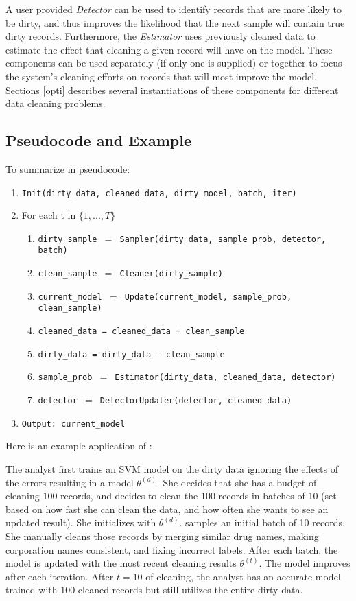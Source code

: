 A user provided {\it Detector} can be used to identify records that are more likely to be dirty, and  thus improves the likelihood that the next sample will contain true dirty records.
Furthermore, the {\it Estimator} uses previously cleaned data to estimate the effect that cleaning a given record will have on the model.
These components can be used separately (if only one is supplied) or together to focus the system's cleaning efforts on records that will most improve the model.
Sections \ref{opti} describes several instantiations of these components for different data cleaning problems.

\subsection{Pseudocode and Example}
\noindent To summarize in pseudocode:
\begin{enumerate}[leftmargin=1em]\scriptsize\sloppy
\item \texttt{Init(dirty\_data, cleaned\_data, dirty\_model, batch, iter)}
\item For each t in $\{1,...,T\}$
\begin{enumerate}
	\item \texttt{dirty\_sample $=$ Sampler(dirty\_data, sample\_prob, detector, batch)}
	\item \texttt{clean\_sample $=$ Cleaner(dirty\_sample)}
	\item \texttt{current\_model $=$ Update(current\_model, sample\_prob, clean\_sample)}
	\item \texttt{cleaned\_data = cleaned\_data + clean\_sample}
	\item \texttt{dirty\_data = dirty\_data - clean\_sample}
	\item \texttt{sample\_prob $=$ Estimator(dirty\_data, cleaned\_data, detector)}
	\item \texttt{detector $=$ DetectorUpdater(detector, cleaned\_data)}
\end{enumerate}
\item \texttt{Output: current\_model}
\end{enumerate}

Here is an example application of \sys:
\begin{example}\label{archex}
The analyst first trains an SVM model on the dirty data ignoring the effects of the errors resulting in a model $\theta^{(d)}$.
She decides that she has a budget of cleaning $100$ records, and decides to clean the 100 records in batches of 10 (set based on how fast she can clean the data, and how often she wants to see an updated result).
She initializes \sys with $\theta^{(d)}$.
\sys samples an initial batch of 10 records.
She manually cleans those records by merging similar drug names, making corporation names consistent, and fixing incorrect labels.
After each batch, the model is updated with the most recent cleaning results $\theta^{(t)}$.
The model improves after each iteration.
After $t=10$ of cleaning, the analyst has an accurate model trained with 100 cleaned records but still utilizes the entire dirty data.
\end{example}


